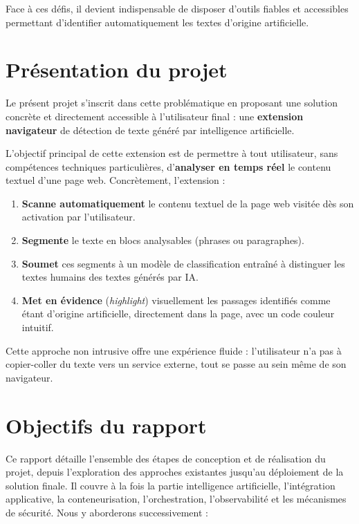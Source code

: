 ﻿\documentclass[12pt, a4paper]{report}
\begin{document}
Face à ces défis, il devient indispensable de disposer d'outils fiables et accessibles 
permettant d'identifier automatiquement les textes d'origine artificielle.

\section{Présentation du projet}

Le présent projet s'inscrit dans cette problématique en proposant une solution concrète 
et directement accessible à l'utilisateur final : une \textbf{extension navigateur} de 
détection de texte généré par intelligence artificielle.

L'objectif principal de cette extension est de permettre à tout utilisateur, sans 
compétences techniques particulières, d'\textbf{analyser en temps réel} le contenu 
textuel d'une page web. Concrètement, l'extension :

\begin{enumerate}
  \item \textbf{Scanne automatiquement} le contenu textuel de la page web visitée 
        dès son activation par l'utilisateur.
  \item \textbf{Segmente} le texte en blocs analysables (phrases ou paragraphes).
  \item \textbf{Soumet} ces segments à un modèle de classification entraîné à 
        distinguer les textes humains des textes générés par IA.
  \item \textbf{Met en évidence} (\textit{highlight}) visuellement les passages 
        identifiés comme étant d'origine artificielle, directement dans la page, 
        avec un code couleur intuitif.
\end{enumerate}

Cette approche non intrusive offre une expérience fluide : l'utilisateur n'a pas à 
copier-coller du texte vers un service externe, tout se passe au sein même de son 
navigateur.

\section{Objectifs du rapport}

Ce rapport détaille l'ensemble des étapes de conception et de réalisation du projet,
depuis l'exploration des approches existantes jusqu'au déploiement de la solution finale.
Il couvre à la fois la partie intelligence artificielle, l'intégration applicative,
la conteneurisation, l'orchestration, l'observabilité et les mécanismes de sécurité.
Nous y aborderons successivement :
\end{document}
